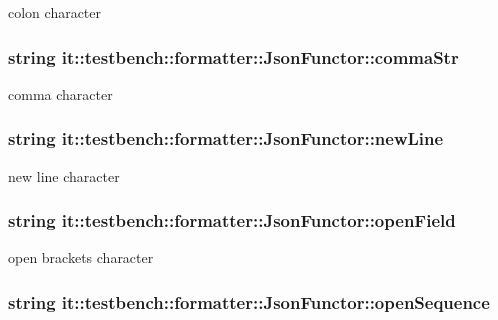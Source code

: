 colon character \hypertarget{classit_1_1testbench_1_1formatter_1_1JsonFunctor_abaa7923bd1ca962e976ab0b3938fe698}{
\subsubsection[{comma\-Str}]{\setlength{\rightskip}{0pt plus 5cm}string it\-::testbench\-::formatter\-::\-Json\-Functor\-::comma\-Str\hspace{0.3cm}{\ttfamily [private]}}}\label{d0/def/classit_1_1testbench_1_1formatter_1_1JsonFunctor_abaa7923bd1ca962e976ab0b3938fe698}
comma character \hypertarget{classit_1_1testbench_1_1formatter_1_1JsonFunctor_a822c32fea9d396841837341307382436}{
\subsubsection[{new\-Line}]{\setlength{\rightskip}{0pt plus 5cm}string it\-::testbench\-::formatter\-::\-Json\-Functor\-::new\-Line\hspace{0.3cm}{\ttfamily [private]}}}\label{d0/def/classit_1_1testbench_1_1formatter_1_1JsonFunctor_a822c32fea9d396841837341307382436}
new line character \hypertarget{classit_1_1testbench_1_1formatter_1_1JsonFunctor_a78a95ca627a66905b3fe89ec0dccfbab}{
\subsubsection[{open\-Field}]{\setlength{\rightskip}{0pt plus 5cm}string it\-::testbench\-::formatter\-::\-Json\-Functor\-::open\-Field\hspace{0.3cm}{\ttfamily [private]}}}\label{d0/def/classit_1_1testbench_1_1formatter_1_1JsonFunctor_a78a95ca627a66905b3fe89ec0dccfbab}
open brackets character \hypertarget{classit_1_1testbench_1_1formatter_1_1JsonFunctor_a4e8d81e4fb87fe2f1a1b9f469dc1d9f2}{
\subsubsection[{open\-Sequence}]{\setlength{\rightskip}{0pt plus 5cm}string it\-::testbench\-::formatter\-::\-Json\-Functor\-::open\-Sequence\hspace{0.3cm}{\ttfamily [private]}}}\label{d0/def/classit_1_1testbench_1_1formatter_1_1JsonFunctor_a4e8d81e4fb87fe2f1a1b9f469dc1d9f2}
